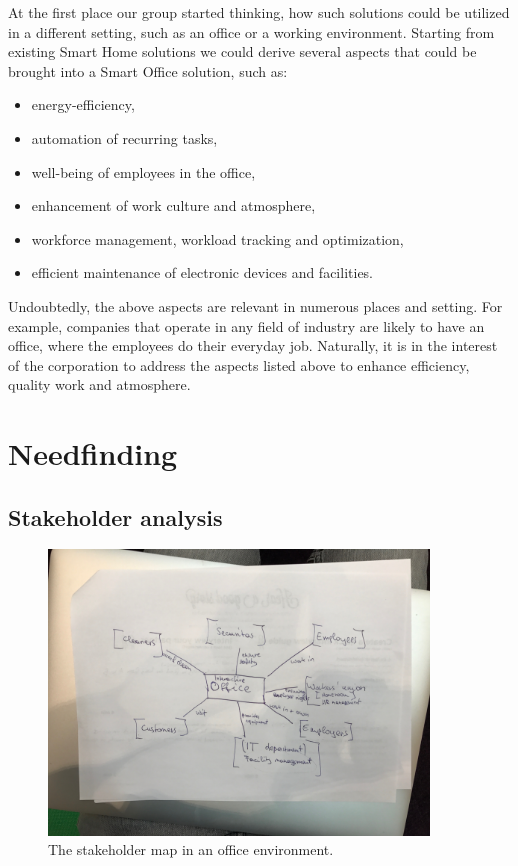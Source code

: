 \documentclass[english]{tktltiki}
\begin{document}
At the first place our group started thinking, how such solutions could be utilized in a different setting, such as an office or a working environment. Starting from existing Smart Home solutions we could derive several aspects that could be brought into a Smart Office solution, such as: 

\begin{itemize}
	\item energy-efficiency, 
	\item automation of recurring tasks,
	\item well-being of employees in the office,
	\item enhancement of work culture and atmosphere, 
	\item workforce management, workload tracking and optimization,
	\item efficient maintenance of electronic devices and facilities.
\end{itemize}

Undoubtedly, the above aspects are relevant in numerous places and setting. For example, companies that operate in any field of industry are likely to have an office, where the employees do their everyday job. Naturally, it is in the interest of the corporation to address the aspects listed above to enhance efficiency, quality work and atmosphere. 

\section{Needfinding}
\subsection{Stakeholder analysis}

	\begin{figure}[h] 
		\begin{center}
			\includegraphics[width=0.9\textwidth]{images/stakeholdermap.jpg}
			\caption{The stakeholder map in an office environment.}
			\label{stakeholder_map}
		\end{center}
	\end{figure}
\end{document}

